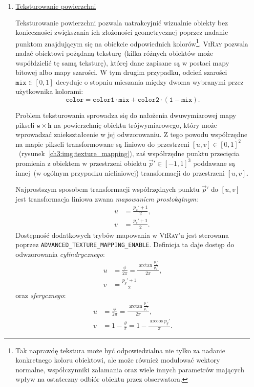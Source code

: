 \begin{enumerate}


\item \underline{Teksturowanie powierzchni}

Teksturowanie powierzchni pozwala uatrakcyjnić wizualnie obiekty bez konieczności zwiększania ich złożoności geometrycznej poprzez nadanie punktom znajdującym się na obiekcie odpowiednich kolorów\footnote{Tak naprawdę tekstura może być odpowiedzialna nie tylko za nadanie konkretnego koloru obiektowi, ale może również modulować wektory normalne, współczynniki załamania oraz wiele innych parametrów mających wpływ na ostateczny odbiór obiektu przez obserwatora.}. \textsc{ViRay} pozwala nadać obiektowi pożądaną teksturę~(kilka różnych obiektów może współdzielić tę samą teksturę), której dane zapisane są w postaci mapy bitowej albo mapy szarości. W tym drugim przypadku, odcień szarości $\mathtt{mix}\in[0, 1]$ decyduje o stopniu mieszania między dwoma wybranymi przez użytkownika kolorami:
\begin{equation*}
\mathtt{color = color1\cdot mix + color2\cdot\left(1 - mix \right)}.
\end{equation*}

Problem teksturowania sprowadza się do nałożenia dwuwymiarowej mapy pikseli $\mathtt{w}\times\mathtt{h}$ na powierzchnię obiektu trójwymiarowego, który może wprowadzać zniekształcenie w jej odwzorowaniu. Z tego powodu współrzędne na mapie pikseli transformowane są liniowo do przestrzeni $[u, v] \in [0, 1]^2$~(rysunek~\ref{ch3:img:texture_mapping}), zaś współrzędne punktu przecięcia promienia z obiektem w przestrzeni obiektu $\vec{p}'\in[-1, 1]^3$ poddawane są innej~(w ogólnym przypadku nieliniowej) transformacji do przestrzeni $[u, v]$. 



Najprostszym sposobem transformacji współrzędnych punktu $\vec{p}'$ do $[u,v]$ jest transformacja liniowa zwana \textit{mapowaniem prostokątnym}:
\begin{align*}
u &= \frac{p_x' + 1}{2},\\
v &= \frac{p_z' + 1}{2}.
\end{align*}
Dostępność dodatkowych trybów mapowania w \textsc{ViRay}'u jest sterowana poprzez \texttt{ADVANCED\_TEXTURE\_MAPPING\_ENABLE}. Definicja ta daje dostęp do odwzorowania \textit{cylindrycznego}:
\begin{align*}
u &= \frac{\phi}{2\pi} = \frac{\arctan\frac{p_x'}{p_z'}}{2\pi},\\
v &= \frac{p_y' + 1}{2}
\end{align*} 
oraz \textit{sferycznego}:
\begin{align*}
u &= \frac{\phi}{2\pi} = \frac{\arctan\frac{p_x'}{p_z'}}{2\pi},\\
v &= 1 - \frac{\theta}{\pi} = 1 - \frac{\arccos p_y'}{\pi}.
\end{align*} 


\end{enumerate}
